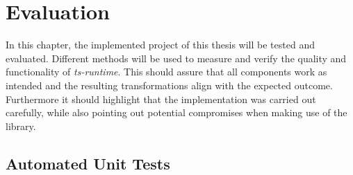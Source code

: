 \chapter{Evaluation}
\label{cha:evaluation}

In this chapter, the implemented project of this thesis will be tested and evaluated. Different methods will be used to measure and verify the quality and functionality of \emph{ts-runtime}. This should assure that all components work as intended and the resulting transformations align with the expected outcome. Furthermore it should highlight that the implementation was carried out carefully, while also pointing out potential compromises when making use of the library.

\section{Automated Unit Tests}
\label{sec:automated-unit-tests}

